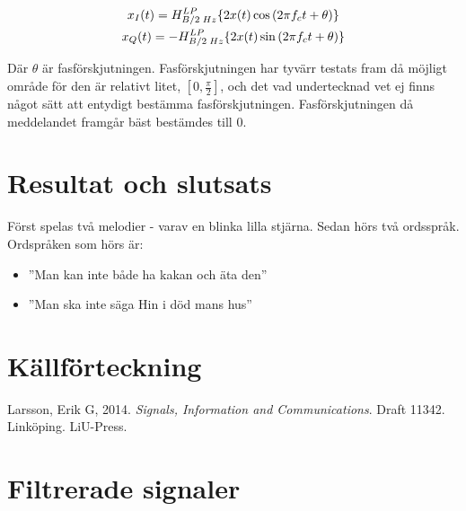 \documentclass[10pt]{article}
\begin{document}
\begin{gather}
x_{I}(t) = \Large{H}_{B/2\;Hz}^{LP}\{2x(t)\cos{(2{\pi}f_{c}t + \theta)}\} \\
x_{Q}(t) = -\Large{H}_{B/2\;Hz}^{LP}\{2x(t)\sin{(2{\pi}f_{c}t + \theta)}\}
\label{equ:iq}
\end{gather}

Där $\theta$ är fasförskjutningen. Fasförskjutningen har tyvärr testats fram då möjligt område för den är relativt litet, $[0,\frac{\pi}{2}]$, och det vad undertecknad vet ej finns något sätt att entydigt bestämma fasförskjutningen. Fasförskjutningen då meddelandet framgår bäst bestämdes till $0$.



\newpage
\section{Resultat och slutsats}

Först spelas två melodier - varav en blinka lilla stjärna. Sedan hörs två ordsspråk. Ordspråken som hörs är: 

\begin{itemize}
	\item ''Man kan inte både ha kakan och äta den''
	\item ''Man ska inte säga Hin i död mans hus''
\end{itemize}


\section{Källförteckning}

Larsson, Erik G, 2014. \textit{Signals, Information and Communications}. Draft 11342. Linköping. LiU-Press.


\appendix
\pagestyle{empty}
\section{Filtrerade signaler}
\end{document}
